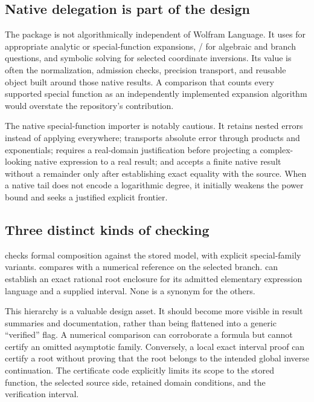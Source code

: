 \subsection{Native delegation is part of the design}
The package is not algorithmically independent of Wolfram Language. It uses  for appropriate analytic or special-function expansions, / for algebraic and branch questions, and symbolic solving for selected coordinate inversions. Its value is often the normalization, admission checks, precision transport, and reusable object built around those native results. A comparison that counts every supported special function as an independently implemented expansion algorithm would overstate the repository's contribution.\cite{core,operations,native}

The native special-function importer is notably cautious. It retains nested  errors instead of applying  everywhere; transports absolute error through products and exponentials; requires a real-domain justification before projecting a complex-looking native expression to a real result; and accepts a finite native result without a remainder only after establishing exact equality with the source. When a native tail does not encode a logarithmic degree, it initially weakens the power bound and seeks a justified explicit frontier.\cite{native}

\subsection{Three distinct kinds of checking}
 checks formal composition against the stored model, with explicit special-family variants.  compares with a numerical reference on the selected branch.  can establish an exact rational root enclosure for its admitted elementary expression language and a supplied interval. None is a synonym for the others.\cite{core,certificates}

This hierarchy is a valuable design asset. It should become more visible in result summaries and documentation, rather than being flattened into a generic ``verified'' flag. A numerical comparison can corroborate a formula but cannot certify an omitted asymptotic family. Conversely, a local exact interval proof can certify a root without proving that the root belongs to the intended global inverse continuation. The certificate code explicitly limits its scope to the stored function, the selected source side, retained domain conditions, and the verification interval.\cite{certificates}
